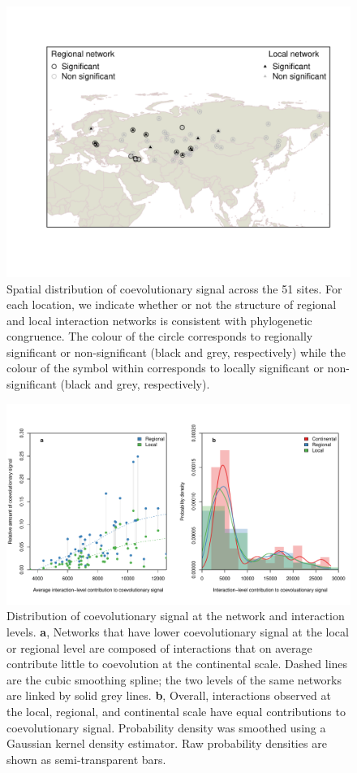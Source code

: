 \begin{figure}[htbp]
\centering
\includegraphics{../figures/figure1.pdf}
\caption{Spatial distribution of coevolutionary signal across the 51
sites. For each location, we indicate whether or not the structure of
regional and local interaction networks is consistent with phylogenetic
congruence. The colour of the circle corresponds to regionally
significant or non-significant (black and grey, respectively) while the
colour of the symbol within corresponds to locally significant or
non-significant (black and grey, respectively).}
\end{figure}

\clearpage

\begin{figure}[htbp]
\centering
\includegraphics{../figures/figure4.pdf}
\caption{Distribution of coevolutionary signal at the network and
interaction levels. \textbf{a}, Networks that have lower coevolutionary
signal at the local or regional level are composed of interactions that
on average contribute little to coevolution at the continental scale.
Dashed lines are the cubic smoothing spline; the two levels of the same
networks are linked by solid grey lines. \textbf{b}, Overall,
interactions observed at the local, regional, and continental scale have
equal contributions to coevolutionary signal. Probability density was
smoothed using a Gaussian kernel density estimator. Raw probability
densities are shown as semi-transparent bars.}
\end{figure}

